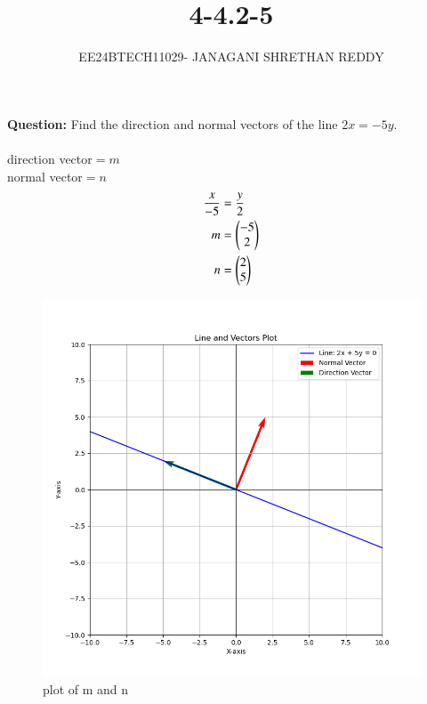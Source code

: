 \documentclass[journal]{IEEEtran}
\begin{document}
 

\vspace{3cm}

\title{4-4.2-5}
\author{EE24BTECH11029- JANAGANI SHRETHAN REDDY}
\maketitle
\bigskip
\renewcommand{\thefigure}{\theenumi}
\renewcommand{\thetable}{\theenumi}
\textbf{Question:}
Find the direction and normal vectors of the line $2x=-5y$.\\
\solution\\

direction vector$=m$\\
normal vector$=n$\\
\begin{align}
\frac{x}{-5}&=\frac{y}{2}\\
 m&=\begin{pmatrix}-5\\2\end{pmatrix}\\
 n&=\begin{pmatrix}2\\5\end{pmatrix}
\end{align}
 \begin{figure}[h!]
  \centering
  \includegraphics[width=1\linewidth]{fig/fig.png}
  \caption{plot of m and n}
 \end{figure}
\end{document}
